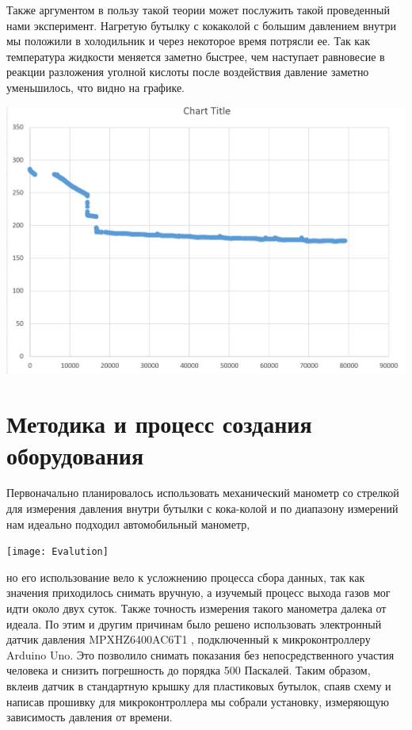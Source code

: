 \documentclass[12pt,a4paper]{scrartcl}
\begin{document}
Также аргументом в пользу такой теории может послужить такой проведенный нами эксперимент. Нагретую бутылку с кокаколой с большим давлением внутри мы положили в холодильник и через некоторое время потрясли ее. Так как температура жидкости меняется заметно быстрее, чем наступает равновесие в реакции разложения уголной кислоты после воздействия давление заметно уменьшилось, что видно на графике.
\begin{flushleft}
\includegraphics[scale=0.5]{Contr}
\end{flushleft}



\section{Методика и процесс создания оборудования}
Первоначально планировалось использовать механический манометр со стрелкой для измерения давления внутри бутылки с кока-колой и по диапазону измерений нам идеально подходил автомобильный манометр,\\
\begin{flushleft}
\texttt{[image: Evalution]}
\end{flushleft}

 но его использование вело к усложнению процесса сбора данных, так как значения приходилось снимать вручную, а изучемый процесс выхода газов мог идти около двух суток. Также точность измерения такого манометра далека от идеала. По этим и другим причинам было решено использовать электронный датчик давления MPXHZ6400AC6T1 , подключенный к микроконтроллеру Arduino Uno. Это позволило снимать показания без непосредственного участия человека и снизить погрешность до порядка 500 Паскалей. Таким образом, вклеив датчик в стандартную крышку для пластиковых бутылок, спаяв схему и написав прошивку для микроконтроллера мы собрали установку, измеряющую зависимость давления от времени.
\end{document}
